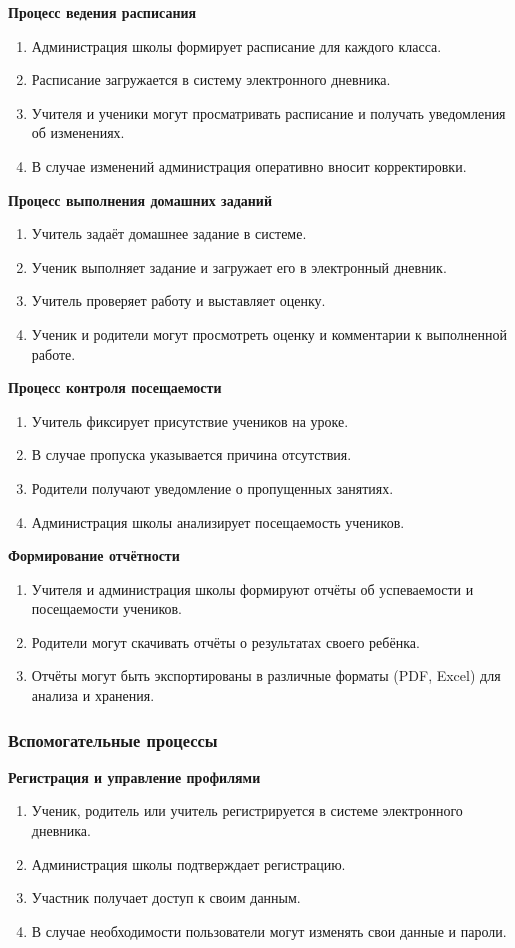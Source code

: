 \documentclass[a4paper, final]{article}
\begin{document}
\noindent \textbf{Процесс ведения расписания}
\begin{enumerate}
  \item Администрация школы формирует расписание для каждого класса.
  \item Расписание загружается в систему электронного дневника.
  \item Учителя и ученики могут просматривать расписание и получать уведомления об изменениях.
  \item В случае изменений администрация оперативно вносит корректировки.
\end{enumerate}

\noindent \textbf{Процесс выполнения домашних заданий}
\begin{enumerate}
  \item Учитель задаёт домашнее задание в системе.
  \item Ученик выполняет задание и загружает его в электронный дневник.
  \item Учитель проверяет работу и выставляет оценку.
  \item Ученик и родители могут просмотреть оценку и комментарии к выполненной работе.
\end{enumerate}

\noindent \textbf{Процесс контроля посещаемости}
\begin{enumerate}
  \item Учитель фиксирует присутствие учеников на уроке.
  \item В случае пропуска указывается причина отсутствия.
  \item Родители получают уведомление о пропущенных занятиях.
  \item Администрация школы анализирует посещаемость учеников.
\end{enumerate}

\noindent \textbf{Формирование отчётности}
\begin{enumerate}
  \item Учителя и администрация школы формируют отчёты об успеваемости и посещаемости учеников.
  \item Родители могут скачивать отчёты о результатах своего ребёнка.
  \item Отчёты могут быть экспортированы в различные форматы (PDF, Excel) для анализа и хранения.
\end{enumerate}


\subsubsection{Вспомогательные процессы}
\noindent \textbf{Регистрация и управление профилями}
\begin{enumerate}
  \item Ученик, родитель или учитель регистрируется в системе электронного дневника.
  \item Администрация школы подтверждает регистрацию.
  \item Участник получает доступ к своим данным.
  \item В случае необходимости пользователи могут изменять свои данные и пароли.
\end{enumerate}
\end{document}
